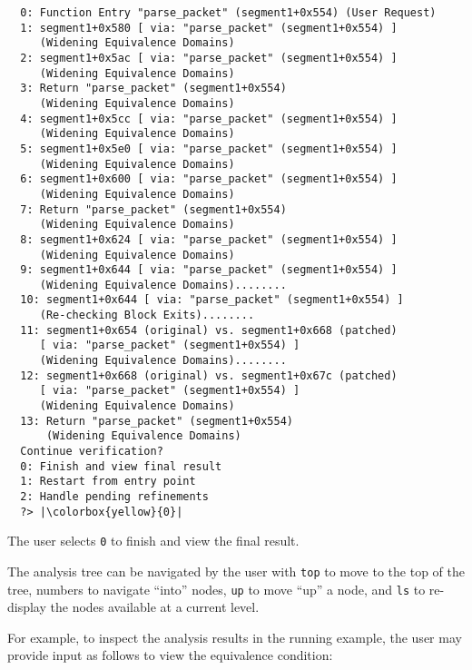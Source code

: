 \begin{lstlisting}
  0: Function Entry "parse_packet" (segment1+0x554) (User Request)
  1: segment1+0x580 [ via: "parse_packet" (segment1+0x554) ]
     (Widening Equivalence Domains)
  2: segment1+0x5ac [ via: "parse_packet" (segment1+0x554) ]
     (Widening Equivalence Domains)
  3: Return "parse_packet" (segment1+0x554)
     (Widening Equivalence Domains)
  4: segment1+0x5cc [ via: "parse_packet" (segment1+0x554) ]
     (Widening Equivalence Domains)
  5: segment1+0x5e0 [ via: "parse_packet" (segment1+0x554) ]
     (Widening Equivalence Domains)
  6: segment1+0x600 [ via: "parse_packet" (segment1+0x554) ]
     (Widening Equivalence Domains)
  7: Return "parse_packet" (segment1+0x554)
     (Widening Equivalence Domains)
  8: segment1+0x624 [ via: "parse_packet" (segment1+0x554) ]
     (Widening Equivalence Domains)
  9: segment1+0x644 [ via: "parse_packet" (segment1+0x554) ]
     (Widening Equivalence Domains)........
  10: segment1+0x644 [ via: "parse_packet" (segment1+0x554) ]
     (Re-checking Block Exits)........
  11: segment1+0x654 (original) vs. segment1+0x668 (patched)
     [ via: "parse_packet" (segment1+0x554) ]
     (Widening Equivalence Domains)........
  12: segment1+0x668 (original) vs. segment1+0x67c (patched)
     [ via: "parse_packet" (segment1+0x554) ]
     (Widening Equivalence Domains)
  13: Return "parse_packet" (segment1+0x554)
      (Widening Equivalence Domains)
  Continue verification?
  0: Finish and view final result
  1: Restart from entry point
  2: Handle pending refinements
  ?> |\colorbox{yellow}{0}|
\end{lstlisting}

The user selects \texttt{0} to finish and view the final result.

The \pate{} analysis tree can be navigated by the user with \texttt{top} to move to the top of the tree, numbers to navigate ``into'' nodes, \texttt{up} to move ``up'' a node, and \texttt{ls} to re-display the nodes available at a current level.

For example, to inspect the analysis results in the running example, the user may provide input as follows to view the equivalence condition:

